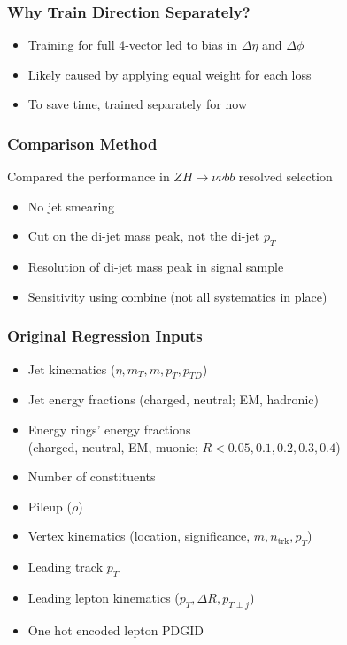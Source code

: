 \documentclass{beamer}
\begin{document}
\begin{frame}
  \frametitle{Why Train Direction Separately?}

  \begin{itemize}
  \item Training for full 4-vector led to bias in
    $\Delta \eta$ and $\Delta \phi$ 
  \item Likely caused by applying equal weight for each loss
  \item To save time, trained separately for now
  \end{itemize}

\end{frame}

\begin{frame}
  \frametitle{Comparison Method}

  Compared the performance in $ZH \rightarrow \nu\nu bb$ resolved selection

  \begin{itemize}
  \item No jet smearing
  \item Cut on the di-jet mass peak, not the di-jet $p_T$
  \item Resolution of di-jet mass peak in signal sample
  \item Sensitivity using combine (not all systematics in place)
  \end{itemize}

\end{frame}

\begin{frame}
  \frametitle{Original Regression Inputs}

  \begin{itemize}
  \item Jet kinematics ($\eta, m_T, m, p_T, p_{TD}$)
  \item Jet energy fractions (charged, neutral; EM, hadronic)
  \item Energy rings' energy fractions \\
    (charged, neutral, EM, muonic; $R < 0.05, 0.1, 0.2, 0.3, 0.4$)
  \item Number of constituents
  \item Pileup ($\rho$)
  \item Vertex kinematics (location, significance, $m, n_\mathrm{trk}, p_T$)
  \item Leading track $p_T$
  \item Leading lepton kinematics ($p_T, \Delta R, p_{T\perp j}$)
  \item One hot encoded lepton PDGID
  \end{itemize}

\end{frame}
\end{document}
